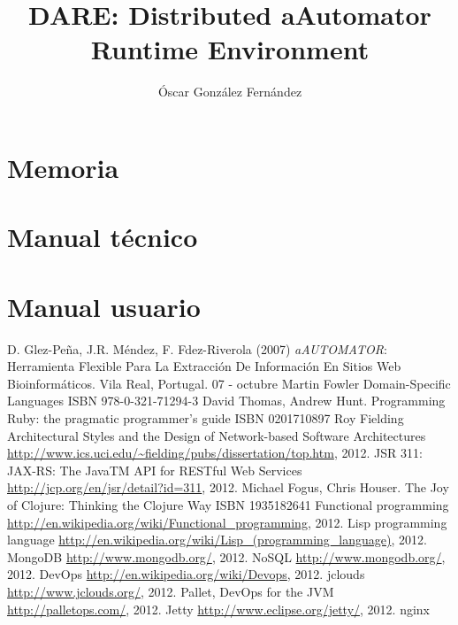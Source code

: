 \documentclass[a4paper,12pt,twoside]{report}
\author{Óscar González Fernández}
\title{DARE: Distributed aAutomator Runtime Environment}
\begin{document}
\tableofcontents
\chapter{Memoria}

\chapter{Manual técnico}

\chapter{Manual usuario}


\begin{thebibliography}{1}

  D. Glez-Peña, J.R. Méndez, F. Fdez-Riverola (2007)
  \newblock \emph{aAUTOMATOR}: Herramienta Flexible Para La
  Extracción De Información En Sitios Web Bioinformáticos. Vila Real,
  Portugal. 07 - octubre
  Martin Fowler
  \newblock Domain-Specific Languages
  \newblock ISBN 978-0-321-71294-3
  David Thomas, Andrew Hunt.
  \newblock Programming Ruby: the pragmatic programmer's guide
  \newblock ISBN 0201710897
  Roy Fielding
  \newblock Architectural Styles and
  the Design of Network-based Software Architectures
  \newblock
  \url{http://www.ics.uci.edu/~fielding/pubs/dissertation/top.htm},
  2012.
  \newblock JSR 311: JAX-RS: The JavaTM API for RESTful Web Services
  \newblock \url{http://jcp.org/en/jsr/detail?id=311}, 2012.
  Michael Fogus, Chris Houser.
  \newblock The Joy of Clojure: Thinking the Clojure Way
  \newblock ISBN 1935182641
  \newblock Functional programming
  \newblock \url{http://en.wikipedia.org/wiki/Functional_programming}, 2012.
  \newblock Lisp programming language
  \newblock \url{http://en.wikipedia.org/wiki/Lisp_(programming_language)}, 2012.
  \newblock MongoDB
  \newblock \url{http://www.mongodb.org/}, 2012.
  \newblock NoSQL
  \newblock \url{http://www.mongodb.org/}, 2012.
  \newblock DevOps
  \url{http://en.wikipedia.org/wiki/Devops}, 2012.
  \newblock jclouds
  \newblock \url{http://www.jclouds.org/}, 2012.
  \newblock Pallet, DevOps for the JVM
  \newblock \url{http://palletops.com/}, 2012.
  \newblock Jetty
  \newblock \url{http://www.eclipse.org/jetty/}, 2012.
  \newblock nginx

\end{thebibliography}
\end{document}
